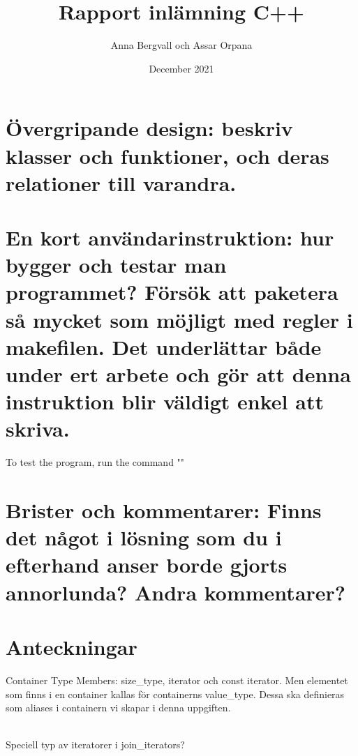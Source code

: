 \documentclass{article}
\title{Rapport inlämning C++}
\author{Anna Bergvall och Assar Orpana}
\date{December 2021}
\begin{document}
\maketitle

\section{Övergripande design: beskriv klasser och funktioner, och deras relationer till varandra.}

\section{En kort användarinstruktion: hur bygger och testar man programmet? Försök att paketera
så mycket som möjligt med regler i makefilen. Det underlättar både under ert arbete och
gör att denna instruktion blir väldigt enkel att skriva.} 
    To test the program, run the command ""

\section{Brister och kommentarer: Finns det något i lösning som du i efterhand anser borde gjorts
annorlunda? Andra kommentarer?}

\section{Anteckningar}

Container Type Members: size\_type, iterator och const iterator. Men elementet som finns i en container kallas för containerns value\_type. Dessa ska definieras som aliases i containern vi skapar i denna uppgiften.

\\

Speciell typ av iteratorer i join\_iterators?
\end{document}
